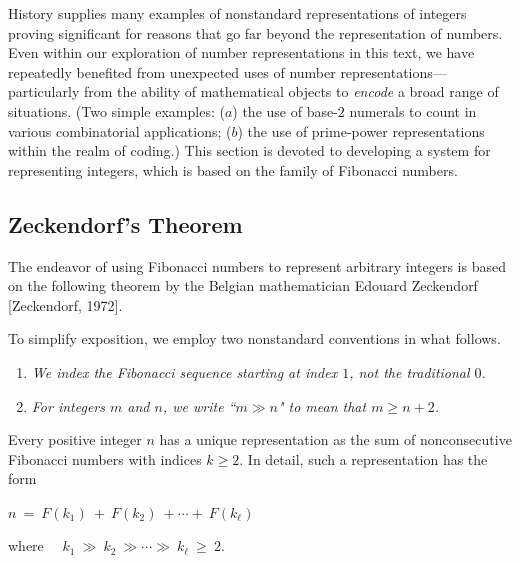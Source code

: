 History supplies many examples of nonstandard representations of integers proving significant for reasons that go far beyond the representation of numbers.  Even within our exploration of number representations in this text, we have repeatedly benefited from unexpected uses of number representations---particularly from the ability of mathematical objects to {\em encode} a broad range of situations.  (Two simple examples: ($a$) the use of base-$2$ numerals to count in various combinatorial applications; ($b$) the use of prime-power representations within the realm of coding.)  This section is devoted to developing a system for representing integers, which is based on the family of Fibonacci numbers.

\subsection{Zeckendorf's Theorem}
\label{sec:Zeckendorf's-Theorem}

 

The endeavor of using Fibonacci numbers to represent arbitrary integers is based on the following theorem by the Belgian mathematician Edouard Zeckendorf  [Zeckendorf, 1972].

\medskip

To simplify exposition, we employ two nonstandard conventions in what follows.
\begin{enumerate}
\item
{\em We index the Fibonacci sequence starting at index $1$, not the traditional $0$.}
\item
{\em For integers $m$ and $n$, we write ``$m \gg n$" to mean that $m \geq n+2$.}
\end{enumerate}


\begin{prop}
\label{thm:Zeckendorf}
Every positive integer $n$ has a unique representation as the sum of nonconsecutive Fibonacci numbers with indices $k \geq 2$.  In detail, such a representation has the form

\smallskip

\hspace*{.25in} $n \ = \ F(k_1) \ + \ F(k_2) \ + \cdots + \ F(k_\ell)$

\smallskip

\noindent
where \ \ $k_1 \ \gg \ k_2 \ \gg \cdots \gg \ k_\ell \ \geq \ 2$.
\end{prop}


